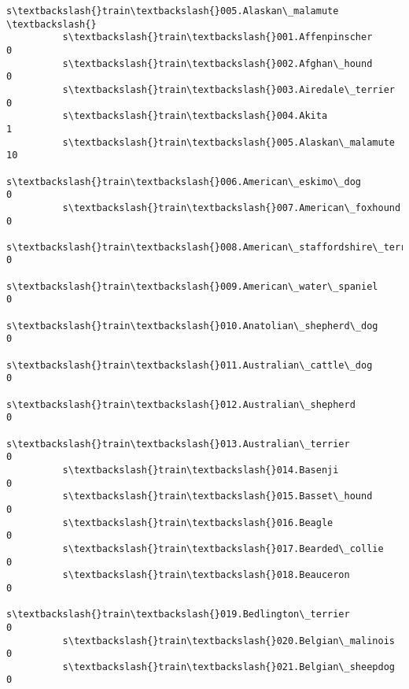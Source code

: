 \documentclass[11pt]{article}
\begin{document}
\begin{Verbatim}[commandchars=\\\{\}]
                                                          s\textbackslash{}train\textbackslash{}005.Alaskan\_malamute  \textbackslash{}
          s\textbackslash{}train\textbackslash{}001.Affenpinscher                                                  0   
          s\textbackslash{}train\textbackslash{}002.Afghan\_hound                                                   0   
          s\textbackslash{}train\textbackslash{}003.Airedale\_terrier                                               0   
          s\textbackslash{}train\textbackslash{}004.Akita                                                          1   
          s\textbackslash{}train\textbackslash{}005.Alaskan\_malamute                                              10   
          s\textbackslash{}train\textbackslash{}006.American\_eskimo\_dog                                            0   
          s\textbackslash{}train\textbackslash{}007.American\_foxhound                                              0   
          s\textbackslash{}train\textbackslash{}008.American\_staffordshire\_terrier                                 0   
          s\textbackslash{}train\textbackslash{}009.American\_water\_spaniel                                         0   
          s\textbackslash{}train\textbackslash{}010.Anatolian\_shepherd\_dog                                         0   
          s\textbackslash{}train\textbackslash{}011.Australian\_cattle\_dog                                          0   
          s\textbackslash{}train\textbackslash{}012.Australian\_shepherd                                            0   
          s\textbackslash{}train\textbackslash{}013.Australian\_terrier                                             0   
          s\textbackslash{}train\textbackslash{}014.Basenji                                                        0   
          s\textbackslash{}train\textbackslash{}015.Basset\_hound                                                   0   
          s\textbackslash{}train\textbackslash{}016.Beagle                                                         0   
          s\textbackslash{}train\textbackslash{}017.Bearded\_collie                                                 0   
          s\textbackslash{}train\textbackslash{}018.Beauceron                                                      0   
          s\textbackslash{}train\textbackslash{}019.Bedlington\_terrier                                             0   
          s\textbackslash{}train\textbackslash{}020.Belgian\_malinois                                               0   
          s\textbackslash{}train\textbackslash{}021.Belgian\_sheepdog                                               0   

\end{Verbatim}
\end{document}
